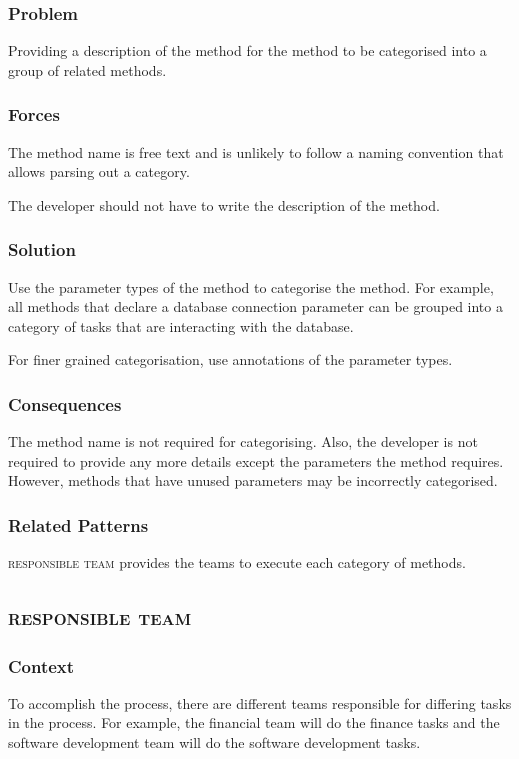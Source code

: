 \documentclass[prodmode]{style/acmlarge}
\begin{document}
\subsubsection*{Problem} Providing a description of the method for the method to be
categorised into a group of related methods.

\subsubsection*{Forces} The method name is free text and is unlikely to follow a naming convention that
allows parsing out a category.

The developer should not have to write the description of the method.

\subsubsection*{Solution} Use the parameter types of the method to categorise
the method.  For example, all methods that declare a database connection
parameter can be grouped into a category of tasks that are interacting with the
database.

For finer grained categorisation, use annotations of the parameter types.

\subsubsection*{Consequences} The method name is not required for categorising.
Also, the developer is not required to provide any more details except the
parameters the method requires.  However, methods that have unused parameters
may be incorrectly categorised.

\subsubsection*{Related Patterns}

\textsc{responsible team} provides the teams to execute each category of
methods.



\subsection{\textsc{\textbf{responsible team}}}

\subsubsection*{Context} To accomplish the process, there are different teams
responsible for differing tasks in the process.  For example, the financial team
will do the finance tasks and the software development team will do the software
development tasks.
\end{document}
